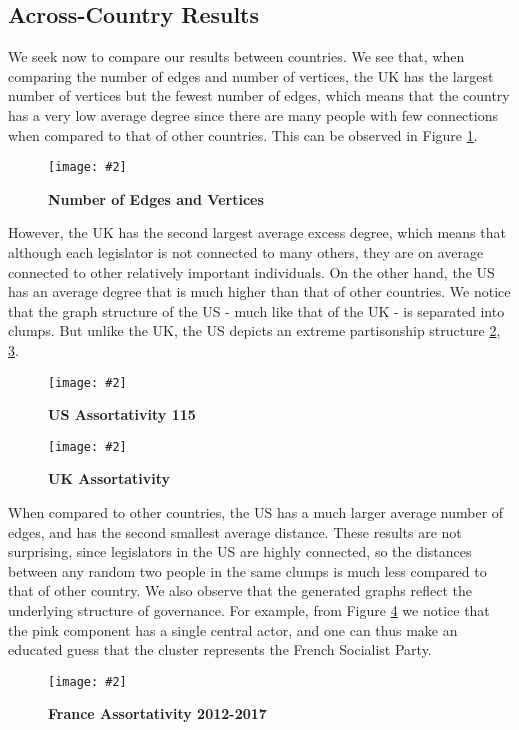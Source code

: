 \documentclass[12pt]{article}
\newcommand{\image}[4][0.6]{
  \begin{figure}[H]
    \centering
    \texttt{[image: \#2]}
    \begin{center}
      \caption[(details)]{\textbf{#4}\label{fig:#3}}
    \end{center}
    \vspace{-2em}
  \end{figure}}
\begin{document}
\begin{multicols*}{2}
\subsection{Across-Country Results}


We seek now to compare our results between countries. We see that, when comparing the number of edges and number of vertices, the UK has the largest number of vertices but the fewest number of edges, which means that the country has a very low average degree since there are many people with few connections when compared to that of other countries. This can be observed in Figure \ref{fig:edge-vert}.
\image[0.26]{../plots/across-country/Number of EdgesNumber of Vertices}{edge-vert}{Number of Edges and Vertices}
However, the UK has the second largest average excess degree, which means that although each legislator is not connected to many others, they are on average connected to other relatively important individuals. On the other hand, the US has an average degree that is much higher than that of other countries. We notice that the graph structure of the US - much like that of the UK - is separated into clumps. But unlike the UK, the US depicts an extreme partisonship structure \ref{fig:us_ass}, \ref{fig:uk_ass}.

\image[0.3]{../plots/graph/US/assortativity/assortativity_us.115.pdf}{us_ass}{US Assortativity 115}
\image[0.3]{../plots/graph/UK/assortativity/assortativity_uk.pdf}{uk_ass}{UK Assortativity}

When compared to other countries, the US has a much larger average number of edges, and has the second smallest average distance. These results are not surprising, since legislators in the US are highly connected, so the distances between any random two people in the same clumps is much less compared to that of other country. We also observe that the generated graphs reflect the underlying structure of governance. For example, from Figure \ref{fig:fr_assortativity} we notice that the pink component has a single central actor, and one can thus make an educated guess that the cluster represents the French Socialist Party. 

\image[0.3]{../plots/graph/france/assortativity/assortativity_net_fr_an2012-2017.pdf}{fr_assortativity}{France Assortativity 2012-2017}





\end{multicols*}
\end{document}
